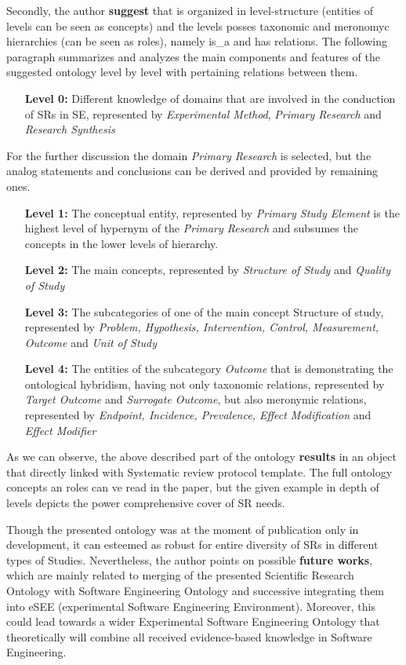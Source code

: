 	Secondly, the author \textbf{suggest} \frqq that is organized in level-structure (entities of levels can be seen as concepts) and the levels posses taxonomic and meronomyc hierarchies (can be seen as roles), namely is\_a and has relations. The following paragraph summarizes and analyzes the main components and features of the suggested ontology level by level with pertaining relations between them.
		\begin{itemize}
			\item[\textbf{Level 0:}]  Different knowledge of domains that are involved in the conduction of SRs in SE, represented by \textit{Experimental Method}, \textit{Primary Research} and \textit{Research Synthesis} 
		\end{itemize}
	For the further discussion the domain \textit{Primary Research} is selected, but the analog statements and conclusions can be derived and provided by remaining ones.
		\begin{itemize}
			\item[\textbf{Level 1:}] The conceptual entity, represented by \textit{Primary Study Element} is the highest level of hypernym of the \textit{Primary Research} and subsumes the concepts in the lower levels of hierarchy.
			\item[\textbf{Level 2:}] The main concepts, represented by \textit{Structure of Study} and \textit{Quality of Study} 
			\item[\textbf{Level 3:}] The subcategories of one of the main concept Structure of study, represented by \textit{Problem, Hypothesis, Intervention, Control, Measurement, Outcome} and \textit{Unit of Study}
			\item[\textbf{Level 4:}] The entities of the subcategory \textit{Outcome} that is demonstrating the ontological hybridism, having not only taxonomic relations, represented by \textit{Target Outcome} and \textit{Surrogate Outcome}, but also meronymic relations, represented by \textit{Endpoint, Incidence, Prevalence, Effect Modification} and \textit{Effect Modifier} 
		\end{itemize}
	  As we can observe, the above described part of the ontology \textbf{results} in an object that directly linked with Systematic review protocol template. The full ontology concepts an roles can ve read in the paper, but the given example in depth of levels depicts the power comprehensive cover of SR needs. \newline
	  
	  Though the presented ontology was at the moment of publication only in development, it can esteemed as robust for entire diversity of SRs in different types of Studies. Nevertheless, the  author points on possible \textbf{future works}, which are mainly related to merging of the presented Scientific Research Ontology with Software Engineering Ontology and successive integrating them into eSEE (experimental Software Engineering Environment). Moreover, this could lead towards a wider Experimental Software Engineering Ontology that theoretically will combine all received evidence-based knowledge in Software Engineering.  
	   
